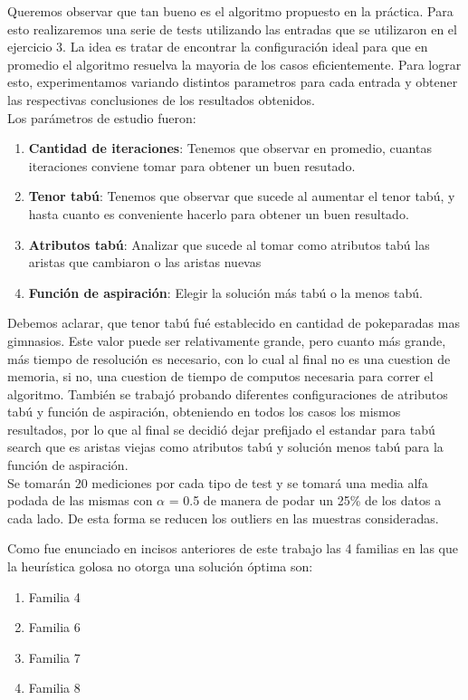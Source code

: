 Queremos observar que tan bueno es el algoritmo propuesto en la práctica. Para esto realizaremos una serie de tests utilizando las entradas que se utilizaron en el ejercicio 3.
La idea es tratar de encontrar la configuración ideal para que en promedio el algoritmo resuelva la mayoria de los casos eficientemente. Para lograr esto, experimentamos variando distintos parametros para cada entrada y obtener las respectivas conclusiones de los resultados obtenidos.\\
Los parámetros de estudio fueron:

\begin{enumerate}
\item  \textbf{Cantidad de iteraciones}: Tenemos que observar en promedio, cuantas iteraciones conviene tomar para obtener un buen resutado.
\item \textbf{Tenor tabú}: Tenemos que observar que sucede al aumentar el tenor tabú, y hasta cuanto es conveniente hacerlo para obtener un buen resultado.
\item \textbf{Atributos tabú}: Analizar que sucede al tomar como atributos tabú las aristas que cambiaron o las aristas nuevas
\item \textbf{Función de aspiración}: Elegir la solución más tabú o la menos tabú.
\end{enumerate}

Debemos aclarar, que tenor tabú fué establecido en cantidad de pokeparadas mas gimnasios. Este valor puede ser relativamente grande, pero cuanto más grande, más tiempo de resolución es necesario, con lo cual al final no es una cuestion de memoria, si no, una cuestion de tiempo de computos necesaria para correr el algoritmo.
También se trabajó probando diferentes configuraciones de atributos tabú y función de aspiración, obteniendo en todos los casos los mismos resultados, por lo que al final se decidió dejar prefijado el estandar para tabú search que es aristas viejas como atributos tabú y solución menos tabú para la función de aspiración.\\

Se tomarán 20 mediciones por cada tipo de test y se tomará una media alfa podada de las mismas con $\alpha$ = 0.5 de manera de podar un 25\% de los datos a cada lado. De esta forma se reducen los outliers en las muestras consideradas. 

Como fue enunciado en incisos anteriores de este trabajo las 4 familias en las que la heur\'istica golosa no otorga una soluci\'on \'optima son:

\begin{enumerate}
\item Familia 4
\item Familia 6
\item Familia 7
\item Familia 8
\end{enumerate}

